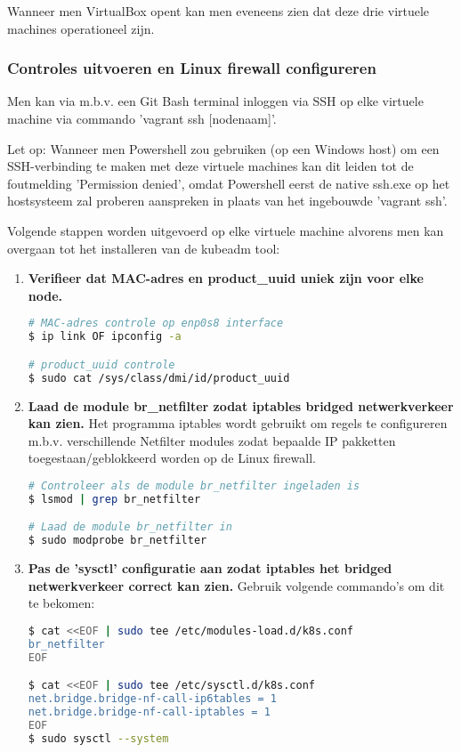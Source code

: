 Wanneer men VirtualBox opent kan men eveneens zien dat deze drie virtuele machines operationeel zijn. 


\subsubsection{Controles uitvoeren en Linux firewall configureren}

Men kan via m.b.v. een Git Bash terminal inloggen via SSH op elke virtuele machine via commando 'vagrant ssh [nodenaam]'.

Let op: Wanneer men Powershell zou gebruiken (op een Windows host) om een SSH-verbinding te maken met deze virtuele machines kan dit leiden tot de foutmelding 'Permission denied', omdat Powershell eerst de native ssh.exe op het hostsysteem zal proberen aanspreken in plaats van het ingebouwde 'vagrant ssh'.

Volgende stappen worden uitgevoerd op elke virtuele machine alvorens men kan overgaan tot het installeren van de kubeadm tool: 
\begin{enumerate}
    \item {\bf Verifieer dat MAC-adres en product_uuid uniek zijn voor elke node.}
\begin{lstlisting}[language=bash]
# MAC-adres controle op enp0s8 interface
$ ip link OF ipconfig -a

# product_uuid controle 
$ sudo cat /sys/class/dmi/id/product_uuid     
\end{lstlisting} 

    \item {\bf Laad de module br_netfilter zodat iptables bridged netwerkverkeer kan zien.}
Het programma iptables wordt gebruikt om regels te configureren m.b.v. verschillende Netfilter modules zodat bepaalde IP pakketten toegestaan/geblokkeerd worden op de Linux firewall.
\begin{lstlisting}[language=bash]
# Controleer als de module br_netfilter ingeladen is 
$ lsmod | grep br_netfilter

# Laad de module br_netfilter in
$ sudo modprobe br_netfilter
\end{lstlisting}

    \item {\bf Pas de 'sysctl' configuratie aan zodat iptables het bridged netwerkverkeer correct kan zien.}
Gebruik volgende commando's om dit te bekomen:
\begin{lstlisting}[language=bash]
$ cat <<EOF | sudo tee /etc/modules-load.d/k8s.conf
br_netfilter
EOF

$ cat <<EOF | sudo tee /etc/sysctl.d/k8s.conf
net.bridge.bridge-nf-call-ip6tables = 1
net.bridge.bridge-nf-call-iptables = 1
EOF
$ sudo sysctl --system
\end{lstlisting}
    
\end{enumerate}


